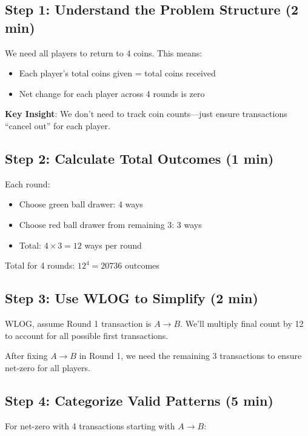 \documentclass[]{article}
\begin{document}
\begin{solutionbox}
\subsection*{Step 1: Understand the Problem Structure (2 min)}
We need all players to return to 4 coins. This means:
\begin{itemize}
    \item Each player's total coins given = total coins received
    \item Net change for each player across 4 rounds is zero
\end{itemize}

\textbf{Key Insight}: We don't need to track coin counts---just ensure transactions ``cancel out'' for each player.

\subsection*{Step 2: Calculate Total Outcomes (1 min)}
Each round:
\begin{itemize}
    \item Choose green ball drawer: 4 ways
    \item Choose red ball drawer from remaining 3: 3 ways  
    \item Total: $4 \times 3 = 12$ ways per round
\end{itemize}
Total for 4 rounds: $12^4 = 20736$ outcomes

\subsection*{Step 3: Use WLOG to Simplify (2 min)}
WLOG, assume Round 1 transaction is $A \to B$. We'll multiply final count by 12 to account for all possible first transactions.

After fixing $A \to B$ in Round 1, we need the remaining 3 transactions to ensure net-zero for all players.

\subsection*{Step 4: Categorize Valid Patterns (5 min)}

For net-zero with 4 transactions starting with $A \to B$:


\end{solutionbox}
\end{document}
